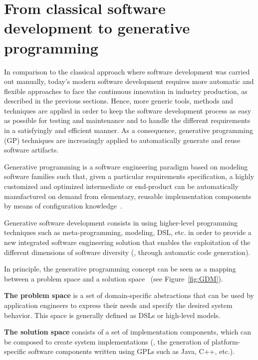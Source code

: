 \section{From classical software development to generative programming}
\label{sec:FROM} 
In comparison to the classical approach where software development was carried out manually, today's modern software development requires more automatic and flexible approaches to face the continuous innovation in industry production, as described in the previous sections.
Hence, more generic tools, methods and techniques are applied in order to keep the software development process as easy as possible for testing and maintenance and to handle the different requirements in a satisfyingly and efficient manner.
As a consequence, generative programming (GP) techniques are increasingly applied to automatically generate and reuse software artifacts.
\begin{mydef}
		Generative programming is a software engineering paradigm based on modeling software families such that, given a particular requirements specification, a highly customized and optimized intermediate or end-product can be automatically manufactured on demand from elementary, reusable implementation components by means of configuration knowledge~\cite{Czarnecki:2000:GPM:345203}.
\end{mydef}


Generative software development consists in using higher-level programming techniques such as meta-programming, modeling, DSL, etc. in order to provide a new integrated software engineering solution that enables the exploitation of the different dimensions of software diversity (\eg, through automatic code generation).

In principle, the generative programming concept can be seen as a mapping between a problem space and a solution space~\cite{czarnecki2005overview} (see Figure~\ref{fig:GDM}). 

\textbf{The problem space} is a set of domain-specific abstractions that can be used by application engineers to express their needs and specify the desired system behavior. This space is generally defined  as DSLs or high-level models. 

\textbf{The solution space} consists of a set of implementation components, which can be composed to create system implementations (\eg, the generation of platform-specific software components written using GPLs such as Java, C++, etc.).

